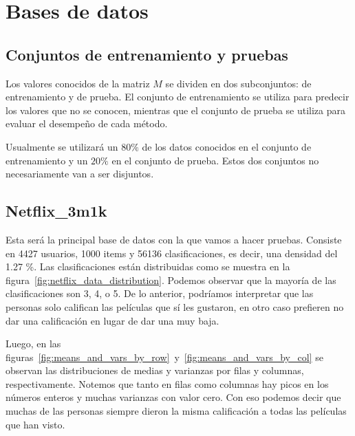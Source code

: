 \section{Bases de datos}

\subsection{Conjuntos de entrenamiento y pruebas}
Los valores conocidos de la matriz $M$ se dividen en dos subconjuntos: de entrenamiento y de prueba. El conjunto de entrenamiento se utiliza para predecir los valores que no se conocen, mientras que el conjunto de prueba se utiliza para evaluar el desempeño de cada método.

Usualmente se utilizará un $80\%$ de los datos conocidos en el conjunto de entrenamiento y un $20\%$ en el conjunto de prueba. Estos dos conjuntos no necesariamente van a ser disjuntos.

\subsection{Netflix\_3m1k}
Esta será la principal base de datos con la que vamos a hacer pruebas. Consiste en 4427 usuarios, 1000 items y 56136 clasificaciones, es decir, una densidad del 1.27 \%. Las clasificaciones están distribuidas como se muestra en la figura~\ref{fig:netflix_data_distribution}. Podemos observar que la mayoría de las clasificaciones son 3, 4, o 5. De lo anterior, podríamos interpretar que las personas solo califican las películas que sí les gustaron, en otro caso prefieren no dar una calificación en lugar de dar una muy baja.

Luego, en las figuras~\ref{fig:means_and_vars_by_row}~y~\ref{fig:means_and_vars_by_col} se observan las distribuciones de medias y varianzas por filas y columnas, respectivamente. Notemos que tanto en filas como columnas hay picos en los números enteros y muchas varianzas con valor cero. Con eso podemos decir que muchas de las personas siempre dieron la misma calificación a todas las películas que han visto.


